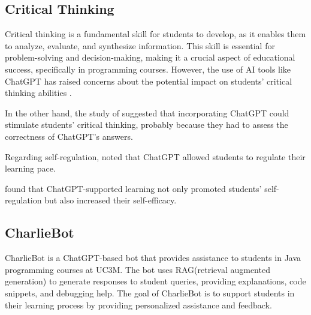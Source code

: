 \documentclass[conference]{IEEEtran}
\begin{document}
\subsection{Critical Thinking}

Critical thinking is a fundamental skill for students to develop, as it enables
them to analyze, evaluate, and synthesize information. This skill is essential
for problem-solving and decision-making, making it a crucial aspect of
educational success, specifically in programming courses. However, the use of AI
tools like ChatGPT has raised concerns about the potential impact on students'
critical thinking abilities \cite{Murillo23} \cite{cai23} \cite{chan23}.

In the other hand, the study of \cite{zhang24} suggested that incorporating
ChatGPT could stimulate students' critical thinking, probably because they
had to assess the correctness of ChatGPT's answers.

Regarding self-regulation, \cite{cai23} noted that ChatGPT allowed students to
regulate their learning pace.

\cite{wu24} found that ChatGPT-supported learning not only promoted students'
self-regulation but also increased their self-efficacy.

\subsection{CharlieBot}

CharlieBot is a ChatGPT-based bot that provides assistance to students in Java
programming courses at UC3M. The bot uses RAG(retrieval augmented generation) to
generate responses to student queries, providing explanations, code snippets,
and debugging help. The goal of CharlieBot is to support students in their
learning process by providing personalized assistance and feedback.
\end{document}
